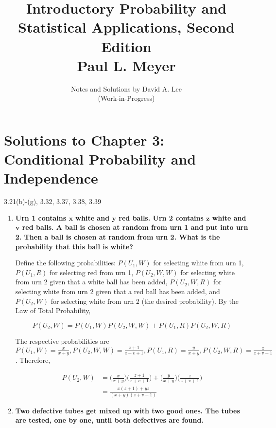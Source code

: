 \documentclass[10pt, oneside]{article}   	%
\title{Introductory Probability and Statistical Applications, Second Edition \\
\large{Paul L. Meyer}}
\author{Notes and Solutions by David A. Lee \\ (Work-in-Progress)}
\date{}							%
\theoremstyle{definition}
\begin{document}
\maketitle
\section*{Solutions to Chapter 3: Conditional Probability and Independence}

3.21(b)-(g), 3.32, 3.37, 3.38, 3.39

\begin{enumerate}[label=3.\arabic*]
\itemsep0em 
\item  \begin{tcolorbox}[
  colback=Cerulean!5!white,
  colframe=Cerulean!75!black]
\textbf{Urn 1 contains $\bm{x}$ white and $\bm{y}$ red balls. Urn 2 contains $\bm{z}$ white and $\bm{v}$ red balls. A ball is chosen at random from urn 1 and put into urn 2. Then a ball is chosen at random from urn 2. What is the probability that this ball is white?}
\end{tcolorbox}

Define the following probabilities: $P(U_1, W)$ for selecting white from urn 1, $P(U_1, R)$ for selecting red from urn 1, $P(U_2, W, W)$ for selecting white from urn 2 given that a white ball has been added, $P(U_2, W, R)$ for selecting white from urn 2 given that a red ball has been added, and $P(U_2, W)$ for selecting white from urn 2 (the desired probability). By the Law of Total Probability, 

\[ P(U_2, W) = P(U_1, W) P(U_2, W, W) + P(U_1, R) P(U_2, W, R) \]

The respective probabilities are $P(U_1, W) = \frac{x}{x+y},  P(U_2, W, W) = \frac{z+1}{z+v+1}, P(U_1, R) = \frac{y}{x+y}, P(U_2, W, R) = \frac{z}{z+v+1}$. Therefore,

\begin{align*}
P(U_2, W) &= \Bigg(  \frac{x}{x+y} \Bigg)  \Bigg( \frac{z+1}{z+v+1} \Bigg) + \Bigg( \frac{y}{x+y} \Bigg) \Bigg( \frac{z}{z+v+1} \Bigg) \\
&= \boxed{ \frac{x(z+1) + yz}{(x+y) (z+v+1)} }
\end{align*}

\item  \begin{tcolorbox}[
  colback=Cerulean!5!white,
  colframe=Cerulean!75!black]
\textbf{Two defective tubes get mixed up with two good ones. The tubes are tested, one by one, until both defectives are found.}
\end{tcolorbox}


\end{enumerate}
\end{document}
